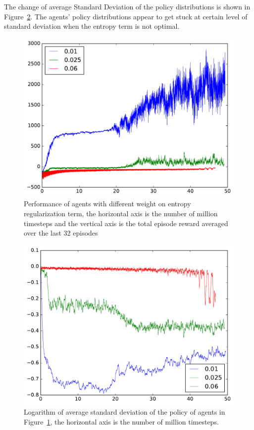 The change of average Standard Deviation of the policy distributions is shown in Figure~\ref{rec_std_ent_reg}. The agents' policy distributions appear to get stuck at certain level of standard deviation when the entropy term is not optimal.
\begin{figure}[!htbp]
	\includegraphics[width=\textwidth]{images/rec_ent_reg.pdf}
	\centering
	\caption{Performance of agents with different weight on entropy regularization term, the horizontal axis is the number of million timesteps and the vertical axis is the total episode reward averaged over the last 32 episodes}\label{rec_ent_reg}
\end{figure}

\begin{figure}[!htbp]
	\includegraphics[width=\textwidth]{images/rec_std_ent_reg.pdf}
	\centering
	\caption{Logarithm of average standard deviation of the policy of agents in Figure~\ref{rec_ent_reg}, the horizontal axis is the number of million timesteps.}\label{rec_std_ent_reg}
\end{figure}

